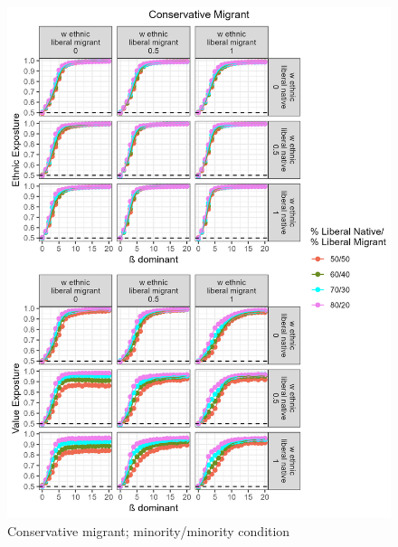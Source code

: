 \documentclass[
]{article}
\begin{document}
\begin{figure}[H]
    \centering
    \includegraphics{images/Conservative Migrant_vlsz.jpg}
    \caption{Conservative migrant; minority/minority condition}
    \label{fig:consmig}
\end{figure}
\end{document}
